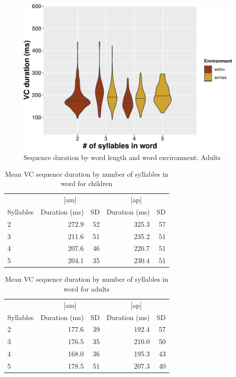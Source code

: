\documentclass[
]{article}
\begin{document}
\begin{figure}
\centering
\includegraphics{3_ch3_results_files/figure-latex/compshort-adults-1.pdf}
\caption{\label{fig:compshort-adults}Sequence duration by word length and word environment: Adults}
\end{figure}

\begin{table}

\caption{\label{tab:dur-by-syll-kids}Mean VC sequence duration by number of syllables in word for children}
\centering
\begin{tabular}[t]{lrrrr}
\toprule
\multicolumn{1}{c}{ } & \multicolumn{2}{c}{[am]} & \multicolumn{2}{c}{[ap]} \\
\cmidrule(l{3pt}r{3pt}){2-3} \cmidrule(l{3pt}r{3pt}){4-5}
Syllables & Duration (ms) & SD  & Duration (ms) & SD\\
\midrule
2 & 272.9 & 52 & 325.3 & 57\\
3 & 211.6 & 51 & 235.2 & 51\\
4 & 207.6 & 46 & 220.7 & 51\\
5 & 204.1 & 35 & 230.4 & 51\\
\bottomrule
\end{tabular}
\end{table}

\begin{table}

\caption{\label{tab:dur-by-syll-adults}Mean VC sequence duration by number of syllables in word for adults}
\centering
\begin{tabular}[t]{lrrrr}
\toprule
\multicolumn{1}{c}{ } & \multicolumn{2}{c}{[am]} & \multicolumn{2}{c}{[ap]} \\
\cmidrule(l{3pt}r{3pt}){2-3} \cmidrule(l{3pt}r{3pt}){4-5}
Syllables & Duration (ms) & SD  & Duration (ms) & SD\\
\midrule
2 & 177.6 & 39 & 192.4 & 57\\
3 & 176.5 & 35 & 210.0 & 50\\
4 & 168.0 & 36 & 195.3 & 43\\
5 & 178.5 & 51 & 207.3 & 40\\
\bottomrule
\end{tabular}
\end{table}
\end{document}
